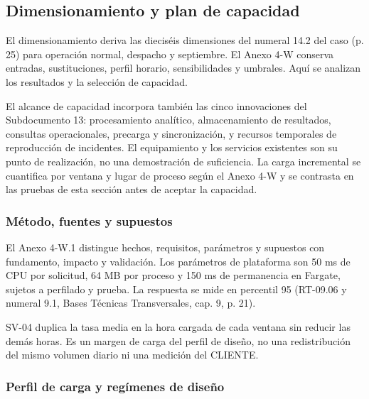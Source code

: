 

\subsection{Dimensionamiento y plan de capacidad}
\label{fuente-12-k-dimensionamiento}
\label{sec:dimensionamiento}

El dimensionamiento deriva las dieciséis dimensiones del numeral 14.2 del caso (p. 25) para operación normal, despacho y septiembre. El Anexo 4-W conserva entradas, sustituciones, perfil horario, sensibilidades y umbrales. Aquí se analizan los resultados y la selección de capacidad.

El alcance de capacidad incorpora también las cinco innovaciones del Subdocumento 13: procesamiento analítico, almacenamiento de resultados, consultas operacionales, precarga y sincronización, y recursos temporales de reproducción de incidentes. El equipamiento y los servicios existentes son su punto de realización, no una demostración de suficiencia. La carga incremental se cuantifica por ventana y lugar de proceso según el Anexo 4-W y se contrasta en las pruebas de esta sección antes de aceptar la capacidad.

\subsubsection{Método, fuentes y supuestos}
\label{sec:dimensionamiento-metodo}

El Anexo 4-W.1 distingue hechos, requisitos, parámetros y supuestos con fundamento, impacto y validación. Los parámetros de plataforma son 50 ms de CPU por solicitud, 64 MB por proceso y 150 ms de permanencia en Fargate, sujetos a perfilado y prueba. La respuesta se mide en percentil 95 (RT-09.06 y numeral 9.1, Bases Técnicas Transversales, cap. 9, p. 21).

SV-04 duplica la tasa media en la hora cargada de cada ventana sin reducir las demás horas. Es un margen de carga del perfil de diseño, no una redistribución del mismo volumen diario ni una medición del CLIENTE.

\subsubsection{Perfil de carga y regímenes de diseño}
\label{sec:dimensionamiento-regimenes}

